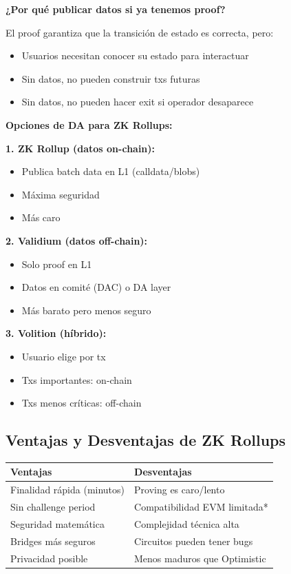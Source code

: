 \documentclass[11pt,a4paper,twoside,openright]{book}
\theoremstyle{definition}
\theoremstyle{plain}
\theoremstyle{remark}
\begin{document}
\begin{keyidea}
\textbf{¿Por qué publicar datos si ya tenemos proof?}

El proof garantiza que la transición de estado es correcta, pero:
\begin{itemize}
    \item Usuarios necesitan conocer su estado para interactuar
    \item Sin datos, no pueden construir txs futuras
    \item Sin datos, no pueden hacer exit si operador desaparece
\end{itemize}

\textbf{Opciones de DA para ZK Rollups:}

\textbf{1. ZK Rollup (datos on-chain):}
\begin{itemize}
    \item Publica batch data en L1 (calldata/blobs)
    \item Máxima seguridad
    \item Más caro
\end{itemize}

\textbf{2. Validium (datos off-chain):}
\begin{itemize}
    \item Solo proof en L1
    \item Datos en comité (DAC) o DA layer
    \item Más barato pero menos seguro
\end{itemize}

\textbf{3. Volition (híbrido):}
\begin{itemize}
    \item Usuario elige por tx
    \item Txs importantes: on-chain
    \item Txs menos críticas: off-chain
\end{itemize}
\end{keyidea}

\subsection{Ventajas y Desventajas de ZK Rollups}

\begin{center}
\begin{tabular}{ll}
\toprule
\textbf{Ventajas} & \textbf{Desventajas} \\
\midrule
Finalidad rápida (minutos) & Proving es caro/lento \\
Sin challenge period & Compatibilidad EVM limitada* \\
Seguridad matemática & Complejidad técnica alta \\
Bridges más seguros & Circuitos pueden tener bugs \\
Privacidad posible & Menos maduros que Optimistic \\
\bottomrule
\end{tabular}
\end{center}
\end{document}
